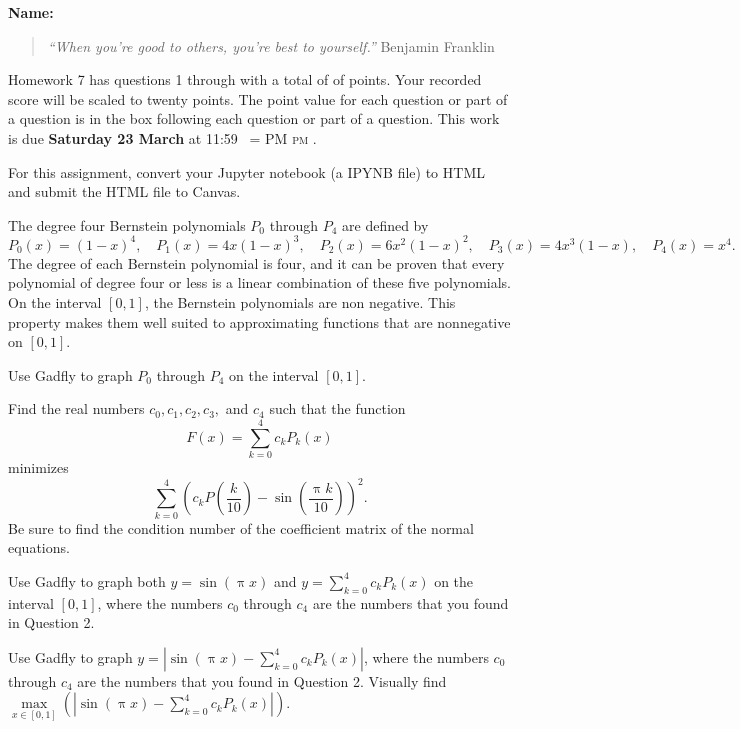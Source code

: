 \documentclass[12pt,fleqn]{exam}
\makeatletter
\newcommand{\quiz}{7}
\newcommand{\term}{Spring}
\DeclareRobustCommand{\maybefakesc}[1]{%
  \ifnum\pdfstrcmp{\f@series}{\bfdefault}=\z@
    {\fontsize{\dimexpr0.8\dimexpr\f@size pt\relax}{0}\selectfont\uppercase{#1}}%
  \else
    \textsc{#1}%
  \fi
}
\newcommand\PM{\,\maybefakesc{pm}\xspace}
\makeatother
\begin{document}
\vspace{0.1in}
\noindent{}
{\bf Name:}  \\
\noindent \makebox[3.0truein][l]{\textbf{Homework \quiz, \term \/ \the\year}}
\vspace{0.1in}

\begin{quote}
\noindent \emph{“When you’re good to others, you’re best to yourself.”} \hfill {\sc Benjamin Franklin}
\end{quote}

\noindent  Homework \quiz\/  has questions 1 through  \numquestions \/ with a total of of  \numpoints\/  points. 
Your recorded score will be scaled to twenty points. The point
value for each question or part of a question is in the box following each question or part of a question.
This work is due \textbf{Saturday 23 March  } at 11:59 \PM.  

For this assignment, convert your Jupyter notebook (a IPYNB file)  to HTML and submit the HTML file to Canvas.

The degree four Bernstein polynomials $P_0$ through $P_4$ are defined by
\begin{equation}
P_0(x) = (1-x)^4, \quad P_1(x)  = 4 x (1-x)^3, \quad P_2(x) = 6 x^2 (1-x)^2, \quad P_3(x) = 4 x^3 (1-x),
\quad P_4(x) = x^4.
\end{equation}
The degree of each Bernstein polynomial is four, and it can be proven that every polynomial of degree four or less is a linear
combination of these five polynomials.  On the interval $[0,1]$, the Bernstein polynomials are non negative. This 
property makes them well suited to approximating functions that are nonnegative on $[0,1]$.  
\begin{questions}

\question [5] Use Gadfly to graph $P_0$ through $P_4$ on the interval $[0,1]$.

\question [5] Find the real numbers $c_0, c_1, c_2,c_3,$ and $c_4$ such that the function 
\begin{equation}
  F(x) = \sum_{k=0}^4 c_k P_k(x)
\end{equation}
minimizes
\begin{equation}
   \sum_{k=0}^4 \left(c_k P \left (\frac{k}{10} \right) - \sin\left(\frac{\uppi k}{10}\right) \right)^2.
 \end{equation}
 Be sure to find the condition number of the coefficient matrix of the normal equations.

\question [5] Use Gadfly to graph both $y = \sin(\uppi x)$ and $ y = \sum_{k=0}^4 c_k P_k(x)$ on the interval $[0,1]$, where the numbers
$c_0$ through $c_4$ are the numbers that you found in Question 2.

\question [5] Use Gadfly to graph  $y = \left| \sin(\uppi x) -  \sum_{k=0}^4 c_k P_k(x) \right| $, where the numbers
$c_0$ through $c_4$ are the numbers that you found in Question 2.  Visually find $\underset{x \in [0,1]}{\max} 
\left(\left| \sin(\uppi x) -  \sum_{k=0}^4 c_k P_k(x) \right| \right).$
\end{questions}
\end{document}
